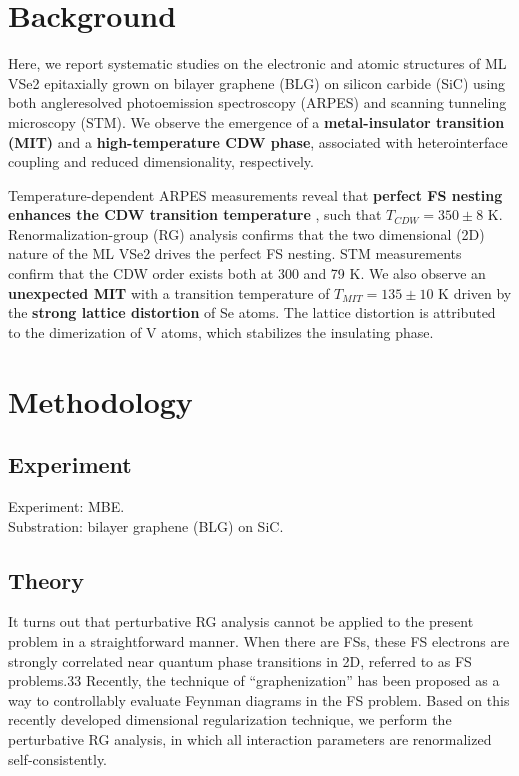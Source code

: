 \section{Background}
Here, we report systematic studies on the electronic and atomic structures of ML VSe2 epitaxially grown on bilayer graphene (BLG) on silicon carbide (SiC) using both angleresolved
photoemission spectroscopy (ARPES) and scanning tunneling microscopy (STM). We observe the emergence of a \textbf{metal-insulator transition (MIT)} and a \textbf{high-temperature CDW phase}, associated with heterointerface coupling and reduced dimensionality, respectively. 

Temperature-dependent ARPES measurements reveal that \textbf{perfect FS nesting enhances the CDW transition temperature} , such that $T_{CDW} = 350 \pm 8$ K. Renormalization-group (RG) analysis confirms that the two dimensional (2D) nature of the ML VSe2 drives the perfect FS nesting. STM measurements confirm that the CDW order exists both at 300 and 79 K. We also observe an \textbf{unexpected MIT} with a transition temperature of $T_{MIT} = 135 \pm 10$ K driven by the \textbf{strong lattice distortion} of Se atoms. The lattice distortion is attributed to the dimerization of V atoms, which stabilizes the insulating phase.

\section{Methodology}

\subsection{Experiment}
Experiment: MBE. \\
Substration: bilayer graphene (BLG) on SiC.

\subsection{Theory}
It turns out that perturbative RG analysis cannot be applied to the present problem in a straightforward manner. When there are FSs, these FS electrons are strongly correlated near quantum phase transitions in 2D, referred to as FS problems.33 Recently, the technique of “graphenization” has been proposed as a way to controllably evaluate Feynman diagrams in the FS problem. Based on this recently developed dimensional regularization technique, we perform the perturbative RG analysis, in which all interaction parameters are renormalized self-consistently.

